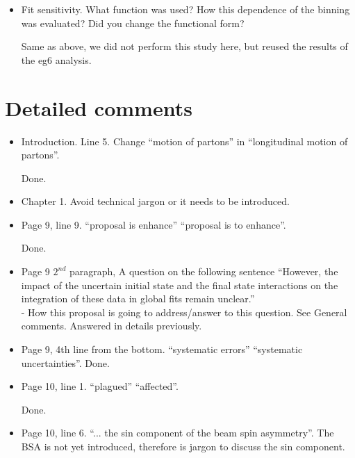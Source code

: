 \begin{itemize}
\begin{itemize}
   \item Fit sensitivity. What function was used? How this dependence of the binning was evaluated? Did you change the functional form?

{\color{red} Same as above, we did not perform this study here, but reused the results of the eg6 analysis.}

  \end{itemize}
  
  \end{itemize}
 

\section*{Detailed comments} 


 \begin{itemize}
 
  \item Introduction. Line 5. Change ``motion of partons'' in ``longitudinal motion of partons''.

     {\color{red} Done.}
  
  \item Chapter 1. Avoid technical jargon or it needs to be introduced.
  
  \item Page 9, line 9. ``proposal is enhance'' \rarr ``proposal is to enhance''.
     
     {\color{red} Done.}
    
  \item  Page 9 $2^{nd}$ paragraph, A question on the following sentence  
     ``However, the impact of the uncertain initial state and the final state 
       interactions on the integration of these data in global fits remain 
       unclear.'' \\
  - How this proposal is going to address/answer to this question. See General comments.
     {\color{red} Answered in details previously.}

  \item Page 9,  4th line from the bottom. ``systematic errors'' \rarr ``systematic uncertainties''.
     {\color{red} Done.}
  
  \item Page 10, line 1. ``plagued'' \rarr ``affected''.
     
     {\color{red} Done.}
  
  \item Page 10, line 6. ``... the sin component of the beam spin asymmetry''.  
     The BSA is not yet introduced, therefore is jargon to discuss the sin 
       component.
  

\end{itemize}
